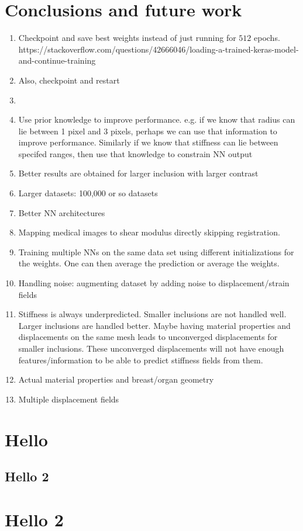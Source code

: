 \documentclass[12pt]{article}
\begin{document}




\section{Conclusions and future work}
\begin{enumerate}
\item{Checkpoint and save best weights instead of just running for $512$ epochs. https://stackoverflow.com/questions/42666046/loading-a-trained-keras-model-and-continue-training}
\item{Also, checkpoint and restart}
\item{}
\item{Use prior knowledge to improve performance. e.g. if we know that radius can lie between 1 pixel and 3 pixels, perhaps we can use that information to improve performance. Similarly if we know that stiffness can lie between specifed ranges, then use that knowledge to constrain NN output}
\item{Better results are obtained for larger inclusion with larger contrast}
\item{Larger datasets: 100,000 or so datasets}
\item{Better NN architectures}
\item{Mapping medical images to shear modulus directly skipping registration.}
\item{Training multiple NNs on the same data set using different initializations for the weights. One can then average the prediction or average the weights.}
\item{Handling noise: augmenting dataset by adding noise to displacement/strain fields}
\item{Stiffness is always underpredicted. Smaller inclusions are not handled well. Larger inclusions are handled better. Maybe having material properties and displacements on the same mesh leads to unconverged displacements for smaller inclusions. These unconverged displacements will not have enough features/information to be able to predict stiffness fields from them.}
\item{Actual material properties and breast/organ geometry}
\item{Multiple displacement fields}
\end{enumerate}
{}

\appendix
\section{Hello}
\subsection{Hello 2}
\section{Hello 2} 
\end{document}
